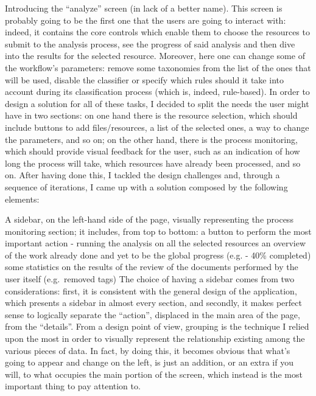\documentclass[12pt,svgnames]{memoir}
\begin{document}
Introducing the ``analyze'' screen (in lack of a better name). This
screen is probably going to be the first one that the users are going to
interact with: indeed, it contains the core controls which enable them
to choose the resources to submit to the analysis process, see the
progress of said analysis and then dive into the results for the
selected resource. Moreover, here one can change some of the workflow's
parameters: remove some taxonomies from the list of the ones that will
be used, disable the classifier or specify which rules should it take
into account during its classification process (which is, indeed,
rule-based). In order to design a solution for all of these tasks, I
decided to split the needs the user might have in two sections: on one
hand there is the resource selection, which should include buttons to
add files/resources, a list of the selected ones, a way to change the
parameters, and so on; on the other hand, there is the process
monitoring, which should provide visual feedback for the user, such as
an indication of how long the process will take, which resources have
already been processed, and so on. After having done this, I tackled the
design challenges and, through a sequence of iterations, I came up with
a solution composed by the following elements:

A sidebar, on the left-hand side of the page, visually representing the
process monitoring section; it includes, from top to bottom: a button to
perform the most important action - running the analysis on all the
selected resources an overview of the work already done and yet to be
the global progress (e.g. - 40\% completed) some statistics on the
results of the review of the documents performed by the user itself
(e.g.~removed tags) The choice of having a sidebar comes from two
considerations: first, it is consistent with the general design of the
application, which presents a sidebar in almost every section, and
secondly, it makes perfect sense to logically separate the ``action'',
displaced in the main area of the page, from the ``details''. From a
design point of view, grouping is the technique I relied upon the most
in order to visually represent the relationship existing among the
various pieces of data. In fact, by doing this, it becomes obvious that
what's going to appear and change on the left, is just an addition, or
an extra if you will, to what occupies the main portion of the screen,
which instead is the most important thing to pay attention to.
\end{document}
